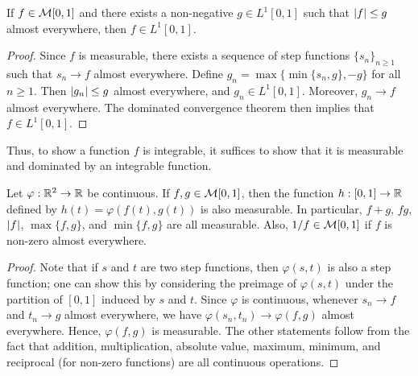 \begin{theorem}
    If $f \in \mathcal{M}[0,1]$ and there exists a non-negative $g \in L^{1}[0,1]$ such that $\left| f \right| \leq g$ almost everywhere, then $f \in L^{1}[0,1]$.
\end{theorem}
\begin{proof}
    Since $f$ is measurable, there exists a sequence of step functions $\{s_{n}\}_{n \geq 1}$ such that $s_{n} \to f$ almost everywhere. Define $g_{n} = \max\{\min\{s_{n},g\},-g\}$ for all $n \geq 1$. Then $\left| g_{n} \right| \leq g$ almost everywhere, and $g_{n} \in L^{1}[0,1]$. Moreover, $g_{n} \to f$ almost everywhere. The dominated convergence theorem then implies that $f \in L^{1}[0,1]$.
\end{proof}

Thus, to show a function $f$ is integrable, it suffices to show that it is measurable and dominated by an integrable function. 

\begin{theorem}
    Let $\varphi: \mathbb{R}^{2} \to \mathbb{R}$ be continuous. If $f,g \in \mathcal{M}[0,1]$, then the function $h:[0,1] \to \mathbb{R}$ defined by $h(t) = \varphi(f(t),g(t))$ is also measurable. In particular, $f+g$, $fg$, $\left| f \right|$, $\max\{f,g\}$, and $\min\{f,g\}$ are all measurable. Also, $1/f \in \mathcal{M}[0,1]$ if $f$ is non-zero almost everywhere.
\end{theorem}

\begin{proof}
    Note that if $s$ and $t$ are two step functions, then $\varphi(s,t)$ is also a step function; one can show this by considering the preimage of $\varphi(s,t)$ under the partition of $[0,1]$ induced by $s$ and $t$. Since $\varphi$ is continuous, whenever $s_{n} \to f$ and $t_{n} \to g$ almost everywhere, we have $\varphi(s_{n},t_{n}) \to \varphi(f,g)$ almost everywhere. Hence, $\varphi(f,g)$ is measurable. The other statements follow from the fact that addition, multiplication, absolute value, maximum, minimum, and reciprocal (for non-zero functions) are all continuous operations.
\end{proof}
